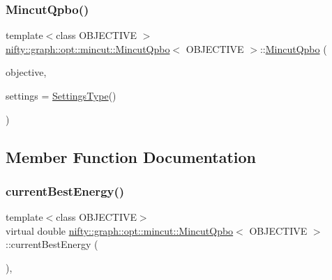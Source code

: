 \mbox{\label{classnifty_1_1graph_1_1opt_1_1mincut_1_1MincutQpbo_a0abee9db61e9ef5acf4c1a5e2cc51515}} 
\subsubsection{\texorpdfstring{Mincut\+Qpbo()}{MincutQpbo()}}
{\footnotesize\ttfamily template$<$class O\+B\+J\+E\+C\+T\+I\+VE $>$ \\
\hyperlink{classnifty_1_1graph_1_1opt_1_1mincut_1_1MincutQpbo}{nifty\+::graph\+::opt\+::mincut\+::\+Mincut\+Qpbo}$<$ O\+B\+J\+E\+C\+T\+I\+VE $>$\+::\hyperlink{classnifty_1_1graph_1_1opt_1_1mincut_1_1MincutQpbo}{Mincut\+Qpbo} (\begin{DoxyParamCaption}\item[{const \hyperlink{classnifty_1_1graph_1_1opt_1_1mincut_1_1MincutQpbo_ac598cbbe660ac111ee5af88095d4b6e7}{Objective\+Type} \&}]{objective,  }\item[{const \hyperlink{structnifty_1_1graph_1_1opt_1_1mincut_1_1MincutQpbo_1_1SettingsType}{Settings\+Type} \&}]{settings = {\ttfamily \hyperlink{structnifty_1_1graph_1_1opt_1_1mincut_1_1MincutQpbo_1_1SettingsType}{Settings\+Type}()} }\end{DoxyParamCaption})}



\subsection{Member Function Documentation}
\mbox{\label{classnifty_1_1graph_1_1opt_1_1mincut_1_1MincutQpbo_a5ec74bde057ce6892451d3c08042945e}} 
\subsubsection{\texorpdfstring{current\+Best\+Energy()}{currentBestEnergy()}}
{\footnotesize\ttfamily template$<$class O\+B\+J\+E\+C\+T\+I\+VE$>$ \\
virtual double \hyperlink{classnifty_1_1graph_1_1opt_1_1mincut_1_1MincutQpbo}{nifty\+::graph\+::opt\+::mincut\+::\+Mincut\+Qpbo}$<$ O\+B\+J\+E\+C\+T\+I\+VE $>$\+::current\+Best\+Energy (\begin{DoxyParamCaption}{ }\end{DoxyParamCaption})\hspace{0.3cm}{\ttfamily [inline]}, {\ttfamily [virtual]}}



